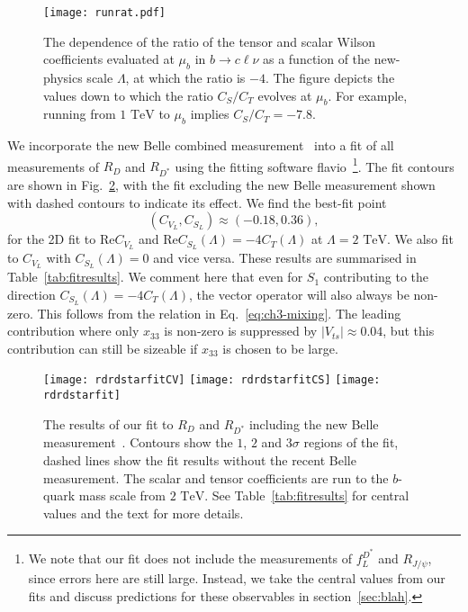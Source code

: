 \begin{figure}[t]
  \centering%
\centering \texttt{[image: runrat.pdf]}
\caption[The dependence of the ratio of the tensor and scalar Wilson
coefficients evaluated at $\mu_b$ in $b \to c \ell \nu$ as a function of the
new-physics scale $\Lambda$, at which the ratio is $-4$.]{The dependence of the
  ratio of the tensor and scalar Wilson coefficients evaluated at $\mu_b$ in
  $b \to c \ell \nu$ as a function of the new-physics scale $\Lambda$, at which
  the ratio is $-4$. The figure depicts the values down to which the ratio
  $C_S/C_T$ evolves at $\mu_b$. For example, running from $1 \text{ TeV}$ to
  $\mu_b$ implies $C_S/C_T= -7.8$.}
\label{fig:ch3-runrat}
\end{figure}

We incorporate the new Belle combined measurement~\cite{Abdesselam:2019dgh} into
a fit of all measurements of $R_{D}$ and $R_{D^*}$ using the fitting software
\textsf{flavio}~\cite{Straub:2018kue}\footnote{We note that our fit does not
  include the measurements of $f_L^{D^*}$ and $R_{J/\psi}$, since errors here
  are still large. Instead, we take the central values from our fits and discuss
  predictions for these observables in section~\ref{sec:blah}.}. The fit
contours are shown in Fig.~\ref{fig:fit}, with the fit excluding the new Belle
measurement shown with dashed contours to indicate its effect. We find the
best-fit point
\begin{equation}
({C}_{V_L}, {C}_{S_L}) \approx (-0.18, 0.36),
\end{equation}
for the 2D fit to $\text{Re} C_{V_L}$ and
$\text{Re} C_{S_L} (\Lambda) = -4 C_T(\Lambda)$ at $\Lambda = 2 \text{ TeV}$. We
also fit to $C_{V_L}$ with $C_{S_L}(\Lambda)=0$ and vice versa. These results
are summarised in Table~\ref{tab:fitresults}. We comment here that even for
$S_{1}$ contributing to the direction $C_{S_L}(\Lambda) = - 4 C_T(\Lambda)$, the
vector operator will also always be non-zero. This follows from the relation in
Eq.~\eqref{eq:ch3-mixing}. The leading contribution where only $x_{33}$ is
non-zero is suppressed by $|V_{ts}| \approx 0.04$, but this contribution can
still be sizeable if $x_{33}$ is chosen to be large.

\begin{figure}
    \centering
    \texttt{[image: rdrdstarfitCV]}
    \texttt{[image: rdrdstarfitCS]}
    \texttt{[image: rdrdstarfit]}
    \caption{The results of our fit to $R_D$ and $R_{D^*}$ including the new
      Belle measurement~\cite{Abdesselam:2019dgh}. Contours show the $1$, $2$
      and $3\sigma$ regions of the fit, dashed lines show the fit results
      without the recent Belle measurement. The scalar and tensor coefficients
      are run to the $b$-quark mass scale from $2 \text{ TeV}$. See
      Table~\ref{tab:fitresults} for central values and the text for more
      details.}
    \label{fig:fit}
\end{figure}

